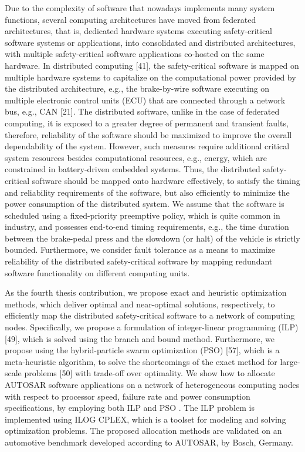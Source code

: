 Due to the complexity of software that nowadays implements many system functions, several computing architectures have moved from federated architectures, that is, dedicated hardware systems executing
safety-critical software systems or applications, into consolidated and distributed architectures, with multiple safety-critical software applications co-hosted on the same hardware. In distributed computing [41], the safety-critical
software is mapped on multiple hardware systems to capitalize on the computational power provided by the distributed architecture, e.g., the brake-by-wire software executing on multiple electronic control units (ECU) that are connected through a network bus, e.g., CAN [21]. The distributed software, unlike in the case of federated computing, it is exposed to a greater degree of permanent and transient faults, therefore, reliability of the software should be maximized to improve the overall dependability of the system. However, such measures require additional critical system resources besides computational resources, e.g., energy, which are constrained in battery-driven embedded systems. Thus, the distributed safety-critical software should be mapped onto hardware effectively, to satisfy the timing and reliability requirements of the software, but also efficiently to minimize the power consumption of the distributed system. We assume that the software is scheduled using a fixed-priority preemptive policy, which is quite common in industry, and possesses end-to-end timing requirements, e.g., the time duration between the brake-pedal press and the slowdown (or halt) of the vehicle is strictly bounded. Furthermore, we consider fault tolerance as a means to maximize reliability of the distributed safety-critical software by mapping redundant software functionality on different computing units.
 
As the fourth thesis contribution, we propose exact and heuristic optimization methods, which deliver optimal and near-optimal solutions, respectively, to efficiently map the distributed safety-critical software to a network of computing nodes. Specifically, we propose a formulation of integer-linear programming (ILP) [49], which is solved using the branch and bound method. Furthermore, we propose using the hybrid-particle swarm optimization (PSO) [57], which is a meta-heuristic algorithm, to solve the shortcomings of the exact method for large-scale problems [50] with trade-off over optimality. We show how to allocate AUTOSAR software applications on a network of heterogeneous
computing nodes with respect to processor speed, failure rate and power consumption specifications, by employing both ILP and PSO . The ILP problem is implemented using ILOG CPLEX, which is a toolset for modeling and solving optimization problems. The proposed allocation methods are validated on an automotive benchmark developed according to AUTOSAR, by Bosch, Germany.

